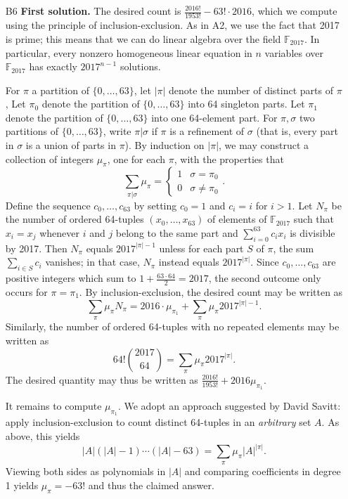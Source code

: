 \documentclass[amssymb,twocolumn,pra,10pt,aps]{revtex4-1}
\begin{document}
\begin{itemize}
\item[B6]
\textbf{First solution.}
The desired count is $\frac{2016!}{1953!}- 63! \cdot 2016$, which we compute using the principle of inclusion-exclusion.
As in A2, we use the fact that 2017 is prime; this means that we can do linear algebra over the field $\mathbb{F}_{2017}$. In particular, every nonzero homogeneous linear equation in $n$ variables over $\mathbb{F}_{2017}$ has exactly $2017^{n-1}$ solutions.

For $\pi$ a partition of $\{0,\dots,63\}$,
let $|\pi|$ denote the number of distinct parts of $\pi$,
Let $\pi_0$ denote the partition of $\{0,\dots,63\}$ into 64 singleton parts.
Let $\pi_1$ denote the partition of $\{0,\dots,63\}$ into one 64-element part.
For $\pi, \sigma$ two partitions of $\{0,\dots,63\}$, write $\pi | \sigma$ if $\pi$ is a refinement of $\sigma$
(that is, every part in $\sigma$ is a union of parts in $\pi$). By induction on $|\pi|$, we may construct 
a collection of integers $\mu_\pi$, one for each $\pi$, with the properties that
\[
\sum_{\pi | \sigma} \mu_\pi = \begin{cases} 1 & \sigma = \pi_0 \\ 0 & \sigma \neq \pi_0 \end{cases}.
\]
Define the sequence $c_0, \dots, c_{63}$ by setting $c_0 = 1$ and $c_i = i$ for $i>1$.
Let $N_\pi$ be the number of ordered 64-tuples $(x_0,\dots,x_{63})$ of elements of $\mathbb{F}_{2017}$
such that  $x_i = x_j$ whenever $i$ and $j$ belong to the same part and
$\sum_{i=0}^{63} c_i x_i$ is divisible by 2017. Then $N_\pi$ equals $2017^{|\pi|-1}$
unless for each part $S$ of $\pi$, the sum $\sum_{i \in S} c_i$ vanishes; in that case,
$N_\pi$ instead equals $2017^{|\pi|}$.
Since $c_0, \dots, c_{63}$ are positive integers which sum to $1 + \frac{63 \cdot 64}{2} = 2017$, the second outcome only occurs for $\pi = \pi_1$. By inclusion-exclusion, the desired count may be written as 
\[
\sum_{\pi} \mu_\pi N_\pi = 2016 \cdot \mu_{\pi_1} + \sum_{\pi} \mu_\pi 2017^{|\pi|-1}.
\]
Similarly, the number of ordered 64-tuples with no repeated elements may be written as
\[
64! \binom{2017}{64} = \sum_{\pi} \mu_\pi 2017^{|\pi|}.
\]
The desired quantity may thus be written as $\frac{2016!}{1953!} + 2016 \mu_{\pi_1}$.

It remains to compute $\mu_{\pi_1}$. We adopt an approach suggested by David Savitt: apply inclusion-exclusion
to count distinct 64-tuples in an \emph{arbitrary} set $A$. As above, this yields
\[
|A|(|A|-1) \cdots (|A|-63) = \sum_{\pi} \mu_\pi |A|^{|\pi|}.
\]
Viewing both sides as polynomials in $|A|$ and comparing coefficients in degree 1 yields
$\mu_\pi = -63!$ and thus the claimed answer.


\end{itemize}
\end{document}
